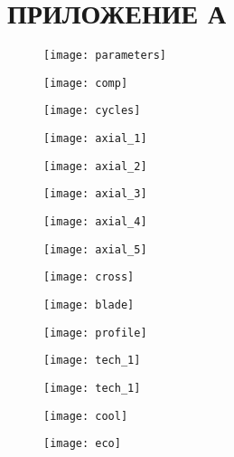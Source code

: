 \section*{ПРИЛОЖЕНИЕ А}

\begin{figure}[H]
    \centering
    \texttt{[image: parameters]}
\end{figure}

\begin{figure}[H]
    \centering
    \texttt{[image: comp]}
\end{figure}

\begin{figure}[H]
    \centering
    \texttt{[image: cycles]}
\end{figure}

\begin{figure}[H]
    \centering
    \texttt{[image: axial\_1]}
\end{figure}

\begin{figure}[H]
    \centering
    \texttt{[image: axial\_2]}
\end{figure}

\begin{figure}[H]
    \centering
    \texttt{[image: axial\_3]}
\end{figure}

\begin{figure}[H]
    \centering
    \texttt{[image: axial\_4]}
\end{figure}

\begin{figure}[H]
    \centering
    \texttt{[image: axial\_5]}
\end{figure}

\begin{figure}[H]
    \centering
    \texttt{[image: cross]}
\end{figure}

\begin{figure}[H]
    \centering
    \texttt{[image: blade]}
\end{figure}

\begin{figure}[H]
    \centering
    \texttt{[image: profile]}
\end{figure}

\begin{figure}[H]
    \centering
    \texttt{[image: tech\_1]}
\end{figure}

\begin{figure}[H]
    \centering
    \texttt{[image: tech\_1]}
\end{figure}

\begin{figure}[H]
    \centering
    \texttt{[image: cool]}
\end{figure}

\begin{figure}[H]
    \centering
    \texttt{[image: eco]}
\end{figure}